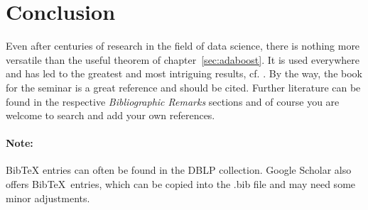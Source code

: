 \section{Conclusion}
\label{conclusion}

Even after centuries of research in the field of data science, 
there is nothing more versatile than the useful theorem of chapter~\ref{sec:adaboost}. 
It is used everywhere and has led to the greatest and most intriguing results, cf. \cite{Someone03}. 
By the way, the book for the seminar \cite{SSBD14} is a great reference and should be cited.
Further literature can be found in the respective \emph{Bibliographic Remarks} sections and 
of course you are welcome to search and add your own references.

\paragraph*{Note:} Bib{\TeX} entries can often be found in the DBLP collection. 
Google Scholar also offers Bib\TeX~entries, which can be copied into the .bib file and may need some minor adjustments.